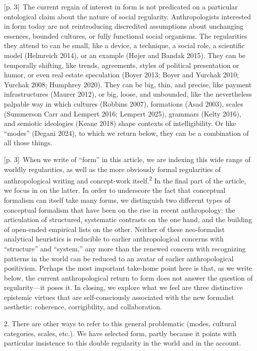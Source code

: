 \documentclass[10pt,a4paper]{article}
\begin{document}
{\scriptsize\color{gray} [p. 3]}\ The current regain of interest in form is not predicated on a particular ontological claim about the nature of social regularity. Anthropologists interested in form today are not reintroducing discredited assumptions about unchanging essences, bounded cultures, or fully functional social organisms. The regularities they attend to can be small, like a device, a technique, a social role, a scientific model (Helmreich 2014), or an example (Højer and Bandak 2015). They can be temporally shifting, like trends, agreements, styles of political presentation or humor, or even real estate speculation (Boyer 2013; Boyer and Yurchak 2010; Yurchak 2008; Humphrey 2020). They can be big, thin, and precise, like payment infrastructures (Maurer 2012), or big, loose, and unbounded, like the nevertheless palpable way in which cultures (Robbins 2007), formations (Asad 2003), scales (Summerson Carr and Lempert 2016; Lempert 2025), grammars (Kelty 2016), and semiotic ideologies (Keane 2018) shape contexts of intelligibility. Or like “modes” (Degani 2024), to which we return below, they can be a combination of all those things.\par
{\scriptsize\color{gray} [p. 3]}\ When we write of “form” in this article, we are indexing this wide range of worldly regularities, as well as the more obviously formal regularities of anthropological writing and concept-work itself.\textsuperscript{2} In the final part of the article, we focus in on the latter. In order to underscore the fact that conceptual formalism can itself take many forms, we distinguish two different types of conceptual formalism that have been on the rise in recent anthropology: the articulation of structured, systematic contrasts on the one hand, and the building of open-ended empirical lists on the other. Neither of these neo-formalist analytical heuristics is reducible to earlier anthropological concerns with “structure” and “system,” any more than the renewed concern with recognizing patterns in the world can be reduced to an avatar of earlier anthropological positivism. Perhaps the most important take-home point here is that, as we write below, the current anthropological return to form does not answer the question of regularity—it poses it. In closing, we explore what we feel are three distinctive epistemic virtues that are self-consciously associated with the new formalist aesthetic: coherence, corrigibility, and collaboration.\par{\small 2. There are other ways to refer to this general problematic (modes, cultural categories, scales, etc.). We have selected form, partly because it points with particular insistence to this double regularity in the world and in the account.\par}
\end{document}
